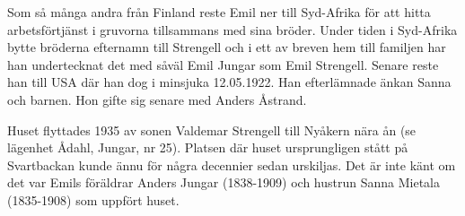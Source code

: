 Som så många andra från Finland reste Emil ner till Syd-Afrika för att hitta arbetsförtjänst i gruvorna tillsammans med sina bröder. Under tiden i Syd-Afrika bytte bröderna efternamn till Strengell och i ett av breven hem till familjen har han undertecknat det med såväl Emil Jungar som Emil Strengell. Senare reste han till USA där han dog i  minsjuka 12.05.1922. Han efterlämnade änkan Sanna och barnen. Hon gifte sig senare med Anders Åstrand.

Huset flyttades 1935 av sonen Valdemar Strengell till Nyåkern nära ån (se lägenhet Ådahl, Jungar, nr 25). Platsen där huset ursprungligen stått på Svartbackan kunde ännu för några decennier sedan urskiljas. Det är inte känt om det var Emils föräldrar Anders Jungar (1838-1909) och hustrun Sanna \textborn Mietala (1835-1908) som uppfört huset.
